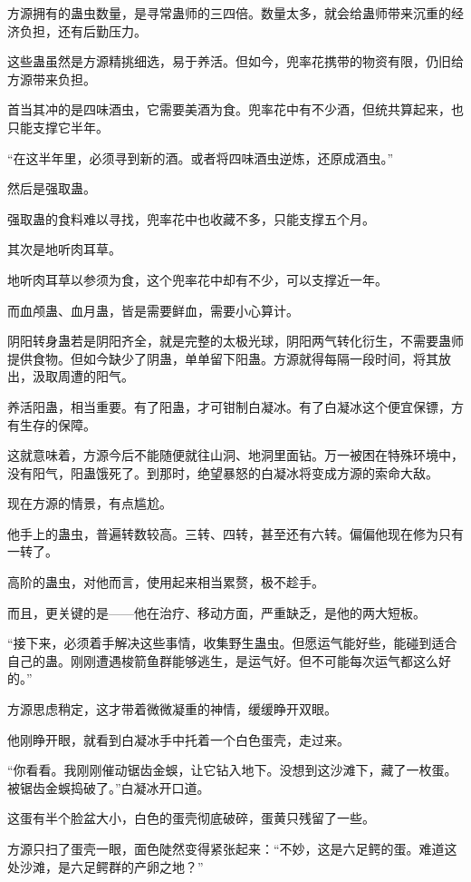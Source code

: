 \begin{this_body}
方源拥有的蛊虫数量，是寻常蛊师的三四倍。数量太多，就会给蛊师带来沉重的经济负担，还有后勤压力。

这些蛊虽然是方源精挑细选，易于养活。但如今，兜率花携带的物资有限，仍旧给方源带来负担。

首当其冲的是四味酒虫，它需要美酒为食。兜率花中有不少酒，但统共算起来，也只能支撑它半年。

“在这半年里，必须寻到新的酒。或者将四味酒虫逆炼，还原成酒虫。”

然后是强取蛊。

强取蛊的食料难以寻找，兜率花中也收藏不多，只能支撑五个月。

其次是地听肉耳草。

地听肉耳草以参须为食，这个兜率花中却有不少，可以支撑近一年。

而血颅蛊、血月蛊，皆是需要鲜血，需要小心算计。

阴阳转身蛊若是阴阳齐全，就是完整的太极光球，阴阳两气转化衍生，不需要蛊师提供食物。但如今缺少了阴蛊，单单留下阳蛊。方源就得每隔一段时间，将其放出，汲取周遭的阳气。

养活阳蛊，相当重要。有了阳蛊，才可钳制白凝冰。有了白凝冰这个便宜保镖，方有生存的保障。

这就意味着，方源今后不能随便就往山洞、地洞里面钻。万一被困在特殊环境中，没有阳气，阳蛊饿死了。到那时，绝望暴怒的白凝冰将变成方源的索命大敌。

现在方源的情景，有点尴尬。

他手上的蛊虫，普遍转数较高。三转、四转，甚至还有六转。偏偏他现在修为只有一转了。

高阶的蛊虫，对他而言，使用起来相当累赘，极不趁手。

而且，更关键的是——他在治疗、移动方面，严重缺乏，是他的两大短板。

“接下来，必须着手解决这些事情，收集野生蛊虫。但愿运气能好些，能碰到适合自己的蛊。刚刚遭遇梭箭鱼群能够逃生，是运气好。但不可能每次运气都这么好的。”

方源思虑稍定，这才带着微微凝重的神情，缓缓睁开双眼。

他刚睁开眼，就看到白凝冰手中托着一个白色蛋壳，走过来。

“你看看。我刚刚催动锯齿金蜈，让它钻入地下。没想到这沙滩下，藏了一枚蛋。被锯齿金蜈捣破了。”白凝冰开口道。

这蛋有半个脸盆大小，白色的蛋壳彻底破碎，蛋黄只残留了一些。

方源只扫了蛋壳一眼，面色陡然变得紧张起来：“不妙，这是六足鳄的蛋。难道这处沙滩，是六足鳄群的产卵之地？”


\end{this_body}
